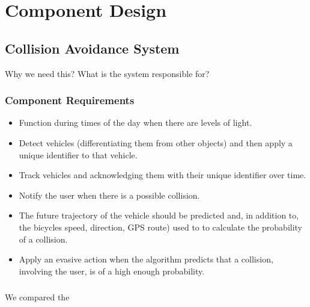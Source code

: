 \documentclass[]{report}
\begin{document}
\chapter{Component Design}
\section{Collision Avoidance System}
Why we need this? What is the system responsible for?
\subsection{Component Requirements}
\begin{itemize}
  \item Function during times of the day when there are levels of light.
  \item Detect vehicles (differentiating them from other objects) and then apply a unique identifier to that vehicle.
  \item Track vehicles and acknowledging them with their unique identifier over time.
  \item Notify the user when there is a possible collision.
  \item The future trajectory of the vehicle should be predicted and, in addition to, the bicycles speed, direction, GPS route) used to to calculate the probability of a collision.
  \item Apply an evasive action when the algorithm predicts that a collision, involving the user, is of a high enough probability. 
\end{itemize}

\paragraph{}

We compared the 
\end{document}
